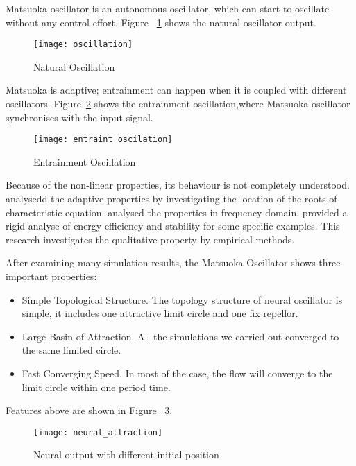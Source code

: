 Matsuoka oscillator is an autonomous oscillator, which can start to oscillate without any control effort.
Figure ~\ref{fig:natural-oscillation} shows the natural oscillator output.
\begin{figure}[h]
\begin{center}
\texttt{[image: oscillation]}
\caption{Natural Oscillation}
\label{fig:natural-oscillation}
\end{center}
\end{figure}





Matsuoka is adaptive; entrainment can happen when it is coupled with different oscillators. 
Figure~\ref{fig:entraint-oscillation} shows the entrainment oscillation,where  Matsuoka oscillator synchronises with the input signal.
\begin{figure}[h]
\begin{center}
\texttt{[image: entraint\_oscilation]}
\caption{Entrainment Oscillation}
\label{fig:entraint-oscillation}
\end{center}
\end{figure}

Because of the non-linear properties, its behaviour is not completely understood. 
\citet{Matsuoka1987} analysedd the adaptive properties by investigating the location of the roots of characteristic equation. 
\citet{Williamson1998} analysed the properties in frequency domain.
\citet{futakataentrainment} provided a rigid analyse of energy efficiency and stability for some specific examples.
This research investigates the qualitative property by  empirical methods.

After examining many simulation results, the Matsuoka Oscillator shows three important properties:
\begin{itemize}
\item{Simple Topological Structure.}
The topology structure of neural oscillator is simple, 
it includes one  attractive limit circle and one fix repellor.
\item{Large Basin of Attraction.}
All the simulations we carried out converged to the same limited circle.
\item{Fast Converging Speed.}
In most of the case, the flow will converge to the limit circle within one period time.
\end{itemize}


Features above are shown in Figure ~\ref{fig:time_timeAttraction}.
\begin{figure}
\begin{center}
\texttt{[image: neural\_attraction]}
\end{center}
\caption{Neural output with different initial position}
\label{fig:time_timeAttraction}
\end{figure}

